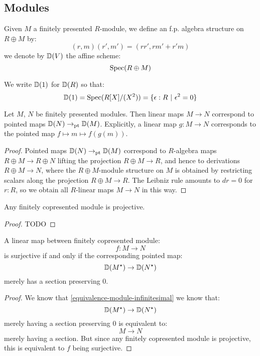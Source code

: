 
\subsection{Modules}

\begin{definition}
Given $M$ a finitely presented $R$-module, we define an f.p. algebra structure on $R\oplus M$ by:
\[(r,m)(r',m') = (rr',rm'+r'm)\]
we denote by $\mathbb{D}(V)$ the affine scheme:
\[\operatorname{Spec}(R\oplus M)\]
\end{definition}

We write $\mathbb{D}(1)$ for $\mathbb{D}(R)$ so that:
\[\D(1) = \Spec(R[X]/(X^2)) = \{\epsilon:R\ |\ \epsilon^2=0\}\]

\begin{lemma}\label{equivalence-module-infinitesimal}
Let $M$, $N$ be finitely presented modules. Then linear maps $M \to N$ correspond to
pointed maps $\mathbb{D}(N) \to_{\mathrm{pt}} \mathbb{D}(M)$. Explicitly, a linear map $g : M \to N$
corresponds to the pointed map $f \mapsto m \mapsto f(g(m))$.
\end{lemma}

\begin{proof}
Pointed maps $\mathbb{D}(N) \to_{\mathrm{pt}} \mathbb{D}(M)$ correspond to 
$R$-algebra maps $R \oplus M \to R \oplus N$ lifting the
projection $R \oplus M \to R$, and hence to derivations
$R \oplus M \to N$, where the $R \oplus M$-module structure on $M$ is obtained by
restricting scalars along the projection $R \oplus M \to R$.
The Leibniz rule amounts to $dr = 0$ for $r : R$, so we obtain all $R$-linear 
maps $M \to N$ in this way.
\end{proof}

\begin{lemma}
Any finitely copresented module is projective.
\end{lemma}

\begin{proof}
TODO
\end{proof}

\begin{lemma}\label{neighborhood-tangent-correspondence-smooth}
A linear map between finitely copresented module:
\[f:M\to N\]
is surjective if and only if the corresponding pointed map:
\[\mathbb{D}(M^\star) \to \mathbb{D}(N^\star)\]
merely has a section preserving $0$.
\end{lemma}

\begin{proof}
We know that \cref{equivalence-module-infinitesimal} we know that:
\[\mathbb{D}(M^\star) \to \mathbb{D}(N^\star)\]
merely having a section preserving $0$ is equivalent to:
\[M\to N\]
merely having a section. But since any finitely copresented module is projective, this is equivalent to $f$ being surjective.
\end{proof}


